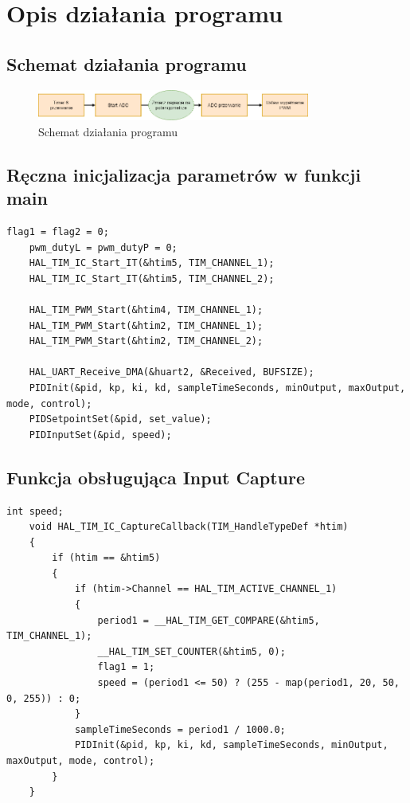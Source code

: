 \documentclass[10pt, a4paper]{article}
\begin{document}
\section{Opis działania programu}

\subsection{Schemat działania programu}
	\begin{figure}[H]
		\centering
		\includegraphics[width=0.8\textwidth]{figures/diagramPWM.png}
		\caption{Schemat działania programu}
		\label{fig:diagramPWM}
	\end{figure}

\subsection{Ręczna inicjalizacja parametrów w funkcji main}
	\begin{lstlisting}[tabsize=2]
	flag1 = flag2 = 0;
	pwm_dutyL = pwm_dutyP = 0;
	HAL_TIM_IC_Start_IT(&htim5, TIM_CHANNEL_1);
	HAL_TIM_IC_Start_IT(&htim5, TIM_CHANNEL_2);
	
	HAL_TIM_PWM_Start(&htim4, TIM_CHANNEL_1);
	HAL_TIM_PWM_Start(&htim2, TIM_CHANNEL_1);
	HAL_TIM_PWM_Start(&htim2, TIM_CHANNEL_2);
	
	HAL_UART_Receive_DMA(&huart2, &Received, BUFSIZE);
	PIDInit(&pid, kp, ki, kd, sampleTimeSeconds, minOutput, maxOutput, mode, control);
	PIDSetpointSet(&pid, set_value);
	PIDInputSet(&pid, speed);
	\end{lstlisting}

\subsection{Funkcja obsługująca Input Capture}
	\begin{lstlisting}[tabsize=2]
	int speed;
	void HAL_TIM_IC_CaptureCallback(TIM_HandleTypeDef *htim)
	{
		if (htim == &htim5)
		{
			if (htim->Channel == HAL_TIM_ACTIVE_CHANNEL_1)
			{
				period1 = __HAL_TIM_GET_COMPARE(&htim5, TIM_CHANNEL_1);
				__HAL_TIM_SET_COUNTER(&htim5, 0);
				flag1 = 1;
				speed = (period1 <= 50) ? (255 - map(period1, 20, 50, 0, 255)) : 0;
			}
			sampleTimeSeconds = period1 / 1000.0;
			PIDInit(&pid, kp, ki, kd, sampleTimeSeconds, minOutput, maxOutput, mode, control);
		}
	}
	\end{lstlisting}
\end{document}
